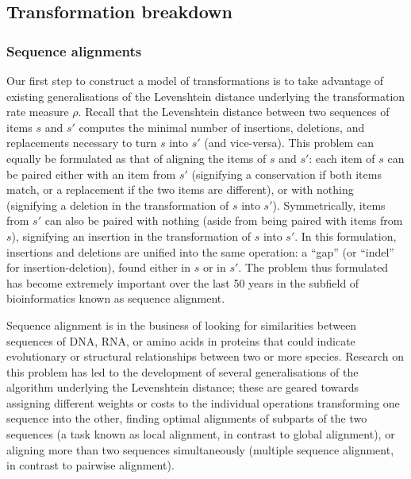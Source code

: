 \documentclass[a4paper,fleqn]{cas-dc}
\begin{document}
\subsection{Transformation breakdown}\label{transformation-breakdown}

\subsubsection{Sequence alignments}\label{sequence-alignments}

Our first step to construct a model of transformations is to take
advantage of existing generalisations of the Levenshtein distance
underlying the transformation rate measure \(\rho\). Recall that the
Levenshtein distance between two sequences of items \(s\) and \(s'\)
computes the minimal number of insertions, deletions, and replacements
necessary to turn \(s\) into \(s'\) (and vice-versa). This problem can
equally be formulated as that of aligning the items of \(s\) and \(s'\):
each item of \(s\) can be paired either with an item from \(s'\)
(signifying a conservation if both items match, or a replacement if the
two items are different), or with nothing (signifying a deletion in the
transformation of \(s\) into \(s'\)). Symmetrically, items from \(s'\)
can also be paired with nothing (aside from being paired with items from
\(s\)), signifying an insertion in the transformation of \(s\) into
\(s'\). In this formulation, insertions and deletions are unified into
the same operation: a \enquote{gap} (or \enquote{indel} for
insertion-deletion), found either in \(s\) or in \(s'\). The problem
thus formulated has become extremely important over the last 50 years in
the subfield of bioinformatics known as sequence alignment.

Sequence alignment is in the business of looking for similarities
between sequences of DNA, RNA, or amino acids in proteins that could
indicate evolutionary or structural relationships between two or more
species. Research on this problem has led to the development of several
generalisations of the algorithm underlying the Levenshtein distance;
these are geared towards assigning different weights or costs to the
individual operations transforming one sequence into the other, finding
optimal alignments of subparts of the two sequences (a task known as
local alignment, in contrast to global alignment), or aligning more than
two sequences simultaneously (multiple sequence alignment, in contrast
to pairwise alignment).
\end{document}
